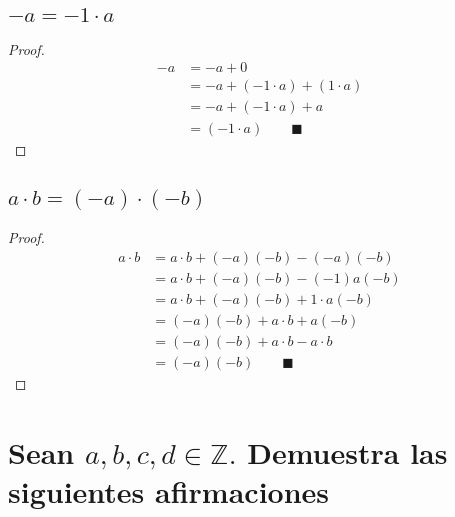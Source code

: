 \documentclass[12pt]{article}
\begin{document}
	    \subsection{$-a = -1 \cdot  a$}
	        \begin{proof}
	          \begin{align}
	          \tag{Neutro Aditivo}
	            -a &= -a +0\\ \tag{Inverso Aditivo}
	            &= -a + (-1 \cdot a) + (1 \cdot a)\\  \tag{Neutro Multiplicativo}
	            &= -a + (-1 \cdot a) +a \\ \tag{Inverso Aditivo}
	            &= (-1 \cdot a) \qquad \blacksquare
	          \end{align}
	        \end{proof}
	    \subsection{$ a \cdot b = (-a)\cdot (-b)$}
	        \begin{proof}
	          \begin{align}
	            \tag{Sumamos elemento neutro}a \cdot b &= a \cdot b +(-a)(-b)-(-a)(-b)\\
	            \tag{Por 2.5}&= a\cdot b + (-a)(-b)-(-1)a(-b)\\
	            \tag{Ley de Signos}&= a\cdot b +(-a)(-b) + 1 \cdot a (-b)\\
	            \tag{Neutro multiplicativo y conmutatividad}&= (-a)(-b) + a\cdot b+a(-b)\\
	            \tag{Por 2.4} &= (-a)(-b) + a\cdot b - a\cdot b\\
	            \tag{Inerso Aditivo}&= (-a)(-b) \qquad \blacksquare
	          \end{align}
	        \end{proof}
	\section{Sean $a,b, c,d \in \mathbb{Z}.$ Demuestra las siguientes afirmaciones}
\end{document}
